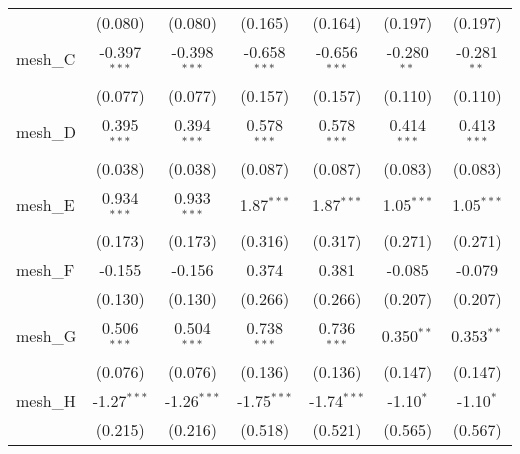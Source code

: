 \begin{tabular}{lcccccc}
                                                               & (0.080)        & (0.080)        & (0.165)        & (0.164)        & (0.197)        & (0.197)\\   
   mesh\_C                                                     & -0.397$^{***}$ & -0.398$^{***}$ & -0.658$^{***}$ & -0.656$^{***}$ & -0.280$^{**}$  & -0.281$^{**}$\\   
                                                               & (0.077)        & (0.077)        & (0.157)        & (0.157)        & (0.110)        & (0.110)\\   
   mesh\_D                                                     & 0.395$^{***}$  & 0.394$^{***}$  & 0.578$^{***}$  & 0.578$^{***}$  & 0.414$^{***}$  & 0.413$^{***}$\\   
                                                               & (0.038)        & (0.038)        & (0.087)        & (0.087)        & (0.083)        & (0.083)\\   
   mesh\_E                                                     & 0.934$^{***}$  & 0.933$^{***}$  & 1.87$^{***}$   & 1.87$^{***}$   & 1.05$^{***}$   & 1.05$^{***}$\\   
                                                               & (0.173)        & (0.173)        & (0.316)        & (0.317)        & (0.271)        & (0.271)\\   
   mesh\_F                                                     & -0.155         & -0.156         & 0.374          & 0.381          & -0.085         & -0.079\\   
                                                               & (0.130)        & (0.130)        & (0.266)        & (0.266)        & (0.207)        & (0.207)\\   
   mesh\_G                                                     & 0.506$^{***}$  & 0.504$^{***}$  & 0.738$^{***}$  & 0.736$^{***}$  & 0.350$^{**}$   & 0.353$^{**}$\\   
                                                               & (0.076)        & (0.076)        & (0.136)        & (0.136)        & (0.147)        & (0.147)\\   
   mesh\_H                                                     & -1.27$^{***}$  & -1.26$^{***}$  & -1.75$^{***}$  & -1.74$^{***}$  & -1.10$^{*}$    & -1.10$^{*}$\\   
                                                               & (0.215)        & (0.216)        & (0.518)        & (0.521)        & (0.565)        & (0.567)\\   

\end{tabular}
